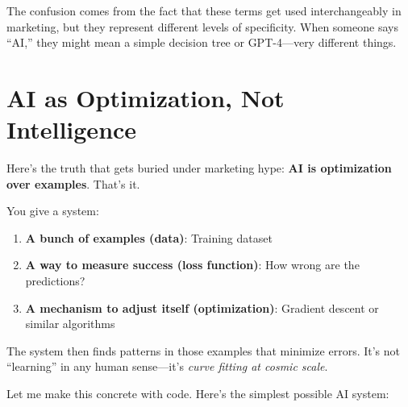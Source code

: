 The confusion comes from the fact that these terms get used interchangeably in marketing, but they represent different levels of specificity. When someone says ``AI,'' they might mean a simple decision tree or GPT-4---very different things.

\section{AI as Optimization, Not Intelligence}

Here's the truth that gets buried under marketing hype: \textbf{AI is optimization over examples}. That's it.

You give a system:
\begin{enumerate}
\item \textbf{A bunch of examples (data)}: Training dataset
\item \textbf{A way to measure success (loss function)}: How wrong are the predictions?
\item \textbf{A mechanism to adjust itself (optimization)}: Gradient descent or similar algorithms
\end{enumerate}

The system then finds patterns in those examples that minimize errors. It's not ``learning'' in any human sense---it's \textit{curve fitting at cosmic scale}.

Let me make this concrete with code. Here's the simplest possible AI system:

